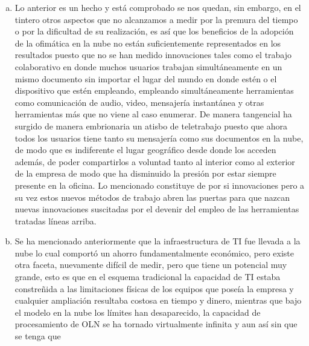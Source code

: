 \begin{enumerate}[a.]
          cada 479 transacciones realizadas, mientras que en post test este valor
          ascendi\'o a 1,101 transacciones por hora hombre empleada en dar
          mantenimiento a TI, lo cual verifica que el incremento del post test
          fue de 130\% con respecto al pre test.
    \item Lo anterior es un hecho y est\'a comprobado se nos quedan, sin embargo,
          en el tintero otros aspectos que no alcanzamos a medir por la premura
          del tiempo o por la dificultad de su realizaci\'on, es as\'i que los
          beneficios de la adopci\'on de la ofim\'atica en la nube no est\'an
          suficientemente representados en los resultados puesto que no se han
          medido innovaciones tales como el trabajo colaborativo en donde muchos
          usuarios trabajan simult\'aneamente en un mismo documento sin importar
          el lugar del mundo en donde est\'en o el dispositivo que est\'en empleando,
          empleando simult\'aneamente herramientas como comunicaci\'on de audio,
          video, mensajer\'ia instant\'anea y otras herramientas m\'as que no
          viene al caso enumerar. De manera tangencial ha surgido de manera embrionaria
          un atisbo de teletrabajo puesto que ahora todos los usuarios tiene tanto
          su mensajer\'ia como sus documentos en la nube, de modo que es
          indiferente el lugar geogr\'afico desde donde los acceden adem\'as,
          de poder compartirlos a voluntad tanto al interior como al exterior de
          la empresa de modo que ha disminuido la presi\'on por estar siempre
          presente en la oficina. Lo mencionado constituye de por si innovaciones
          pero a su vez estos nuevos m\'etodos de trabajo abren las puertas para
          que nazcan nuevas innovaciones suscitadas por el devenir del empleo de
          las herramientas tratadas l\'ineas arriba.
    \item Se ha mencionado anteriormente que la infraestructura de TI fue llevada
          a la nube lo cual comport\'o un ahorro fundamentalmente econ\'omico,
          pero existe otra faceta, nuevamente dif\'icil de medir, pero que tiene
          un potencial muy grande, esto es que en el esquema tradicional la
          capacidad de TI estaba constre\~nida a las limitaciones f\'isicas de los
          equipos que pose\'ia la empresa y cualquier ampliaci\'on resultaba
          costosa en tiempo y dinero, mientras que bajo el modelo en la nube
          los l\'imites han desaparecido, la capacidad de procesamiento de OLN
          se ha tornado virtualmente infinita y aun as\'i sin que se tenga que

\end{enumerate}
